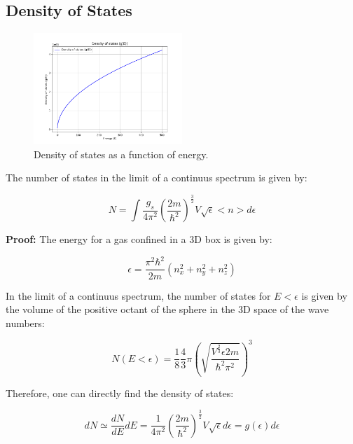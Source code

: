 \documentclass{article}
\begin{document}
\subsection{Density of States}

\begin{figure}[h]
    \centering
    \includegraphics[width=0.5\textwidth]{images/statistical-physics/state-density.png}
    \caption{Density of states as a function of energy.}
    \label{fig:density-of-states}
\end{figure}

\begin{tcolorbox}[colframe=gray!50, colback=gray!10, coltitle=black, title=Number of states]
    The number of states in the limit of a continuus spectrum is given by:

    \begin{equation}
        N=\int \frac{g_s}{4\pi^2}\left( \frac{2m}{\hbar^2} \right)^{\frac{3}{2}}V\sqrt{\epsilon} <n>d\epsilon
    \end{equation}
\end{tcolorbox}

\textbf{Proof:}
The energy for a gas confined in a 3D box is given by:

\begin{equation}
    \epsilon=\frac{\pi^2\hbar^2}{2m}(n_x^2+n_y^2+n_z^2)
\end{equation}

In the limit of a continuus spectrum, the number of states for $E<\epsilon$ is given by the volume of the
positive octant of the sphere in the 3D space of the wave numbers:

\begin{equation}
    N(E<\epsilon)= \frac{1}{8} \frac{4}{3}\pi \left(\sqrt{\frac{V^\frac{2}{3} \epsilon 2m}{\hbar^2\pi^2}}\right)^3
\end{equation}

Therefore, one can directly find the density of states:

\begin{equation}
    dN\simeq\frac{dN}{dE}dE=\frac{1}{4\pi^2}\left(\frac{2m}{\hbar^2}\right)^{\frac{3}{2}}V\sqrt{\epsilon}d\epsilon=g(\epsilon)d\epsilon
\end{equation}
\end{document}
